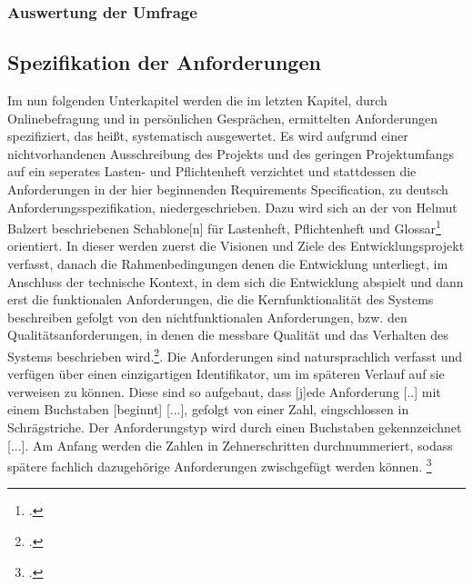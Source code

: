 \subsubsection{Auswertung der Umfrage}

\subsection{Spezifikation der Anforderungen}
Im nun folgenden Unterkapitel werden die im letzten Kapitel, durch Onlinebefragung und in persönlichen Gesprächen, ermittelten Anforderungen spezifiziert, das heißt, systematisch ausgewertet. Es wird aufgrund einer nichtvorhandenen Ausschreibung des Projekts und des geringen Projektumfangs auf ein seperates Lasten- und Pflichtenheft verzichtet und stattdessen die Anforderungen in der hier beginnenden \glqq{}Requirements Specification\grqq{}, zu deutsch \glqq{}Anforderungsspezifikation\grqq{}, niedergeschrieben. Dazu wird sich an der von Helmut Balzert beschriebenen \glqq{}Schablone[n] für Lastenheft, Pflichtenheft und Glossar\grqq{}\footcite[S. 492]{balzert} orientiert. In dieser werden zuerst die Visionen und Ziele des Entwicklungsprojekt verfasst, danach die Rahmenbedingungen denen die Entwicklung unterliegt, im Anschluss der technische Kontext, in dem sich die Entwicklung abspielt und dann erst die funktionalen Anforderungen, die die Kernfunktionalität des Systems beschreiben gefolgt von den nichtfunktionalen Anforderungen, bzw. den Qualitätsanforderungen, in denen die messbare Qualität und das Verhalten des Systems beschrieben wird.\footcite[Vgl.][S. 492 ff.]{balzert}. Die Anforderungen sind natursprachlich verfasst und verfügen über einen einzigartigen Identifikator, um im späteren Verlauf auf sie verweisen zu können. Diese sind so aufgebaut, dass \glqq{} [j]ede Anforderung [..] mit einem Buchstaben [beginnt] [...], gefolgt von einer Zahl, eingschlossen in Schrägstriche. Der Anforderungstyp wird durch einen Buchstaben gekennzeichnet [...]. Am Anfang werden  die Zahlen in Zehnerschritten durchnummeriert, sodass spätere fachlich dazugehörige Anforderungen zwischgefügt werden können.\grqq{} \footcite[S. 493]{balzert}

